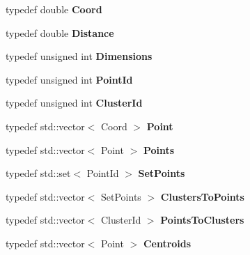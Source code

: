\begin{DoxyCompactItemize}
\item 
\hypertarget{namespacekukadu_a53d736e9108e87316673bcfcd8226780}{typedef double {\bfseries Coord}}\label{namespacekukadu_a53d736e9108e87316673bcfcd8226780}

\item 
\hypertarget{namespacekukadu_ae1cbcb147e3dc5064880320c2c9b6dc7}{typedef double {\bfseries Distance}}\label{namespacekukadu_ae1cbcb147e3dc5064880320c2c9b6dc7}

\item 
\hypertarget{namespacekukadu_a728df7f207a3c6b0dfd28d7dd546e5f5}{typedef unsigned int {\bfseries Dimensions}}\label{namespacekukadu_a728df7f207a3c6b0dfd28d7dd546e5f5}

\item 
\hypertarget{namespacekukadu_a02d2fa18ebd7965d7ec4810719c97deb}{typedef unsigned int {\bfseries Point\-Id}}\label{namespacekukadu_a02d2fa18ebd7965d7ec4810719c97deb}

\item 
\hypertarget{namespacekukadu_abd5fe11abfe2df8520174c32f6f2a67b}{typedef unsigned int {\bfseries Cluster\-Id}}\label{namespacekukadu_abd5fe11abfe2df8520174c32f6f2a67b}

\item 
\hypertarget{namespacekukadu_ae56bf75d832d53ac502efb8a21c22144}{typedef std\-::vector$<$ Coord $>$ {\bfseries Point}}\label{namespacekukadu_ae56bf75d832d53ac502efb8a21c22144}

\item 
\hypertarget{namespacekukadu_a031e9cd069e03edfe2dbb746610e8d17}{typedef std\-::vector$<$ Point $>$ {\bfseries Points}}\label{namespacekukadu_a031e9cd069e03edfe2dbb746610e8d17}

\item 
\hypertarget{namespacekukadu_a8e379b5b193ab8a74ca7b690c2831f74}{typedef std\-::set$<$ Point\-Id $>$ {\bfseries Set\-Points}}\label{namespacekukadu_a8e379b5b193ab8a74ca7b690c2831f74}

\item 
\hypertarget{namespacekukadu_af2a88faeb228f7b67112e994a3db8179}{typedef std\-::vector$<$ Set\-Points $>$ {\bfseries Clusters\-To\-Points}}\label{namespacekukadu_af2a88faeb228f7b67112e994a3db8179}

\item 
\hypertarget{namespacekukadu_a5847dd1e58ac4746143040f0733890fc}{typedef std\-::vector$<$ Cluster\-Id $>$ {\bfseries Points\-To\-Clusters}}\label{namespacekukadu_a5847dd1e58ac4746143040f0733890fc}

\item 
\hypertarget{namespacekukadu_a630f7f65e1f9c65949814a0cd297b182}{typedef std\-::vector$<$ Point $>$ {\bfseries Centroids}}\label{namespacekukadu_a630f7f65e1f9c65949814a0cd297b182}

\end{DoxyCompactItemize}
